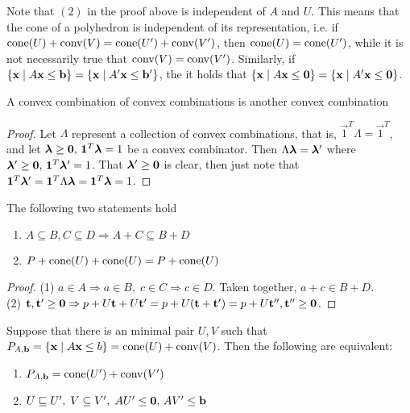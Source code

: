 \begin{Remark}\label{characteristic_cone}  Note that $(2)$ in the proof above is independent of $A$ and $U$.  This means that the cone of a polyhedron is independent of its representation, i.e. if $\operatorname{cone}(U) + \operatorname{conv}(V) = \operatorname{cone}(U') + \operatorname{conv}(V')$, then $\operatorname{cone}(U) = \operatorname{cone}(U')$, while it is not necessarily true that $\operatorname{conv}(V) = \operatorname{conv}(V')$.  Similarly, if $\left\{\mathbf{x}\;|\; A\mathbf{x}\leq \mathbf{b}\right\} = \left\{\mathbf{x}\;|\; A'\mathbf{x}\leq \mathbf{b}'\right\}$, the it holds that $\left\{\mathbf{x}\;|\; A\mathbf{x}\leq\mathbf{0}\right\} = \left\{\mathbf{x}\;|\; A'\mathbf{x}\leq\mathbf{0}\right\}$.
\end{Remark}

\begin{Prop}\label{conv_conv}
	A convex combination of convex combinations is another convex combination
\end{Prop}
\begin{proof}
	Let $\Lambda$ represent a collection of convex combinations, that is, $\vec{1}^T\Lambda = \vec{1}^T$, and let $\bm{\lambda}\geq\mathbf{0},\,\mathbf{1}^T\bm{\lambda} = 1$ be a convex combinator.  Then $\Lambda\bm{\lambda} = \bm{\lambda}'$ where $\bm{\lambda}'\geq\mathbf{0},\,\mathbf{1}^T\bm{\lambda}'=1$.  That $\bm{\lambda}'\geq\mathbf{0}$ is clear, then just note that $\mathbf{1}^T\bm{\lambda}' = \mathbf{1}^T\Lambda\bm{\lambda} = \mathbf{1}^T\bm{\lambda} = 1$.
\end{proof}

\begin{Prop}\label{minkowski_formula}
	The following two statements hold
	\begin{enumerate}
		\item $A \subseteq B, C\subseteq D \Rightarrow A + C \subseteq B + D$
		\item $P + \operatorname{cone}(U) + \operatorname{cone}(U) = P + \operatorname{cone}(U)$
	\end{enumerate}
\end{Prop}

\begin{proof}
	(1) $a\in A \Rightarrow a\in B,\; c\in C\Rightarrow c\in D$.  Taken together, $a+c \in B+D$.\\
	(2) $\mathbf{t},\mathbf{t}'\geq\mathbf{0} \Rightarrow p + U\mathbf{t} + U\mathbf{t}' = p + U(\mathbf{t}+\mathbf{t}') = p + U\mathbf{t}'', \mathbf{t}''\geq\mathbf{0}$.
\end{proof}

\begin{EqCriteria}\label{eq_hp_vp}
	Suppose that there is an minimal pair $U,V$ such that $P_{A,\mathbf{b}} = \left\{\mathbf{x}\;|\; A\mathbf{x}\leq b\right\} = \operatorname{cone}(U) + \operatorname{conv}(V)$.  Then the following are equivalent:
	\begin{enumerate}
		\item $P_{A,\mathbf{b}} = \operatorname{cone}(U') + \operatorname{conv}(V')$
		\item $U \sqsubseteq U',\; V \subseteq V',\; AU'\leq\mathbf{0},\, AV'\leq\mathbf{b}$
	\end{enumerate}
\end{EqCriteria}


